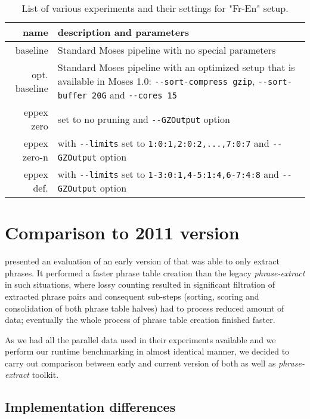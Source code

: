 \begin{table}[ht]
\centering
\begin{tabular}{ r p{10cm} }
name & description and parameters \\
\hline
\hline
baseline      & Standard Moses pipeline with no special parameters \\
opt. baseline & Standard Moses pipeline with an optimized setup that is available in Moses 1.0:
\verb|--sort-compress gzip|, \verb|--sort-buffer 20G| and \verb|--cores 15| \\
eppex zero    & \eppex{} set to no pruning and \verb|--GZOutput| option \\
eppex zero-n  & \eppex{} with \verb|--limits| set to \verb|1:0:1,2:0:2,...,7:0:7| and \verb|--GZOutput| option \\
eppex def.    & \eppex{} with \verb|--limits| set to \verb|1-3:0:1,4-5:1:4,6-7:4:8| and \verb|--GZOutput| option \\
\hline
\hline
\end{tabular}
\caption{\label{fr-en-80-scenarios}
List of various experiments and their settings for "Fr-En" setup.}
\end{table}


\section{Comparison to 2011 version}
\label{sec:cu-bojar-results}

\citet{przywara:eppex} presented an evaluation of an early version of \eppex{}
that was able to only extract phrases. It performed a faster phrase
table creation than the legacy \emph{phrase-extract} in such situations,
where lossy counting resulted in significant filtration of extracted phrase
pairs and consequent sub-steps (sorting, scoring and consolidation of both
phrase table halves) had to process reduced amount of data;
eventually the whole process of phrase table creation finished faster.

As we had all the parallel data used in their experiments available and
we perform our runtime benchmarking in almost identical manner,
we decided to carry out comparison between early and current version of
both \eppex{} as well as \emph{phrase-extract} toolkit.

\subsection{Implementation differences}

